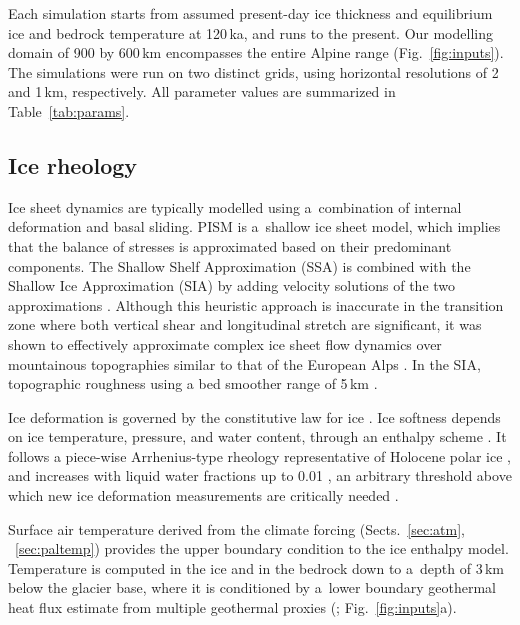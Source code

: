 \documentclass[tc, manuscript]{copernicus}
\begin{document}
    Each simulation starts from assumed present-day ice thickness and
    equilibrium ice and bedrock temperature at 120\,ka, and runs to the
    present. Our modelling domain of 900 by 600\,km encompasses the
    entire Alpine range (Fig.~\ref{fig:inputs}). The simulations were run on
    two distinct grids, using horizontal resolutions of 2 and 1\,km,
    respectively.
    All parameter values are summarized in Table~\ref{tab:params}.


\subsection{Ice rheology}
\label{sec:icedyn}

    Ice sheet dynamics are typically modelled using a~combination of internal
    deformation and basal sliding. PISM is a~shallow ice sheet model, which
    implies that the balance of stresses is approximated based on their
    predominant components. The Shallow Shelf Approximation (SSA) is combined
    with the Shallow Ice Approximation (SIA) by adding velocity solutions of
    the two approximations \citep[Eqs.~7--9 and 15]{Winkelmann.etal.2011}.
    Although this heuristic approach is inaccurate in the transition zone
    where both vertical shear and longitudinal stretch are significant,
    it was shown to effectively approximate complex ice sheet flow
    dynamics over mountainous topographies similar to that of the European Alps
    \citep{Golledge.etal.2012, Ziemen.etal.2016}. In the SIA, topographic
    roughness using a bed smoother range of 5\,km \citep{Schoof.2003}.

    Ice deformation is governed by the constitutive law for ice
    \citep{Glen.1952, Nye.1953}. Ice softness depends on ice temperature,
    pressure, and water content, through an enthalpy scheme
    \citep[Table~\ref{tab:params};][]{Aschwanden.etal.2012}. It follows a
    piece-wise Arrhenius-type rheology representative of Holocene polar ice
    \citep[Table~\ref{tab:params};][p.~77]{Cuffey.Paterson.2010}, and increases
    with liquid water fractions up to 0.01 \citep[p.~65--66]{Duval.1977,
    Lliboutry.Duval.1985, Cuffey.Paterson.2010}, an arbitrary threshold above
    which new ice deformation measurements are critically needed
    \citep{Kleiner.etal.2015}.

    Surface air temperature derived from the climate forcing
    (Sects.~\ref{sec:atm}, ~\ref{sec:paltemp}) provides the upper boundary
    condition to the ice
    enthalpy model. Temperature is computed in the ice and in the bedrock down
    to a~depth of 3\,km below the glacier base, where it is
    conditioned by a~lower boundary geothermal heat flux estimate from multiple
    geothermal proxies (\citealp[similarity method]{Goutorbe.etal.2011};
    Fig.~\ref{fig:inputs}a).
\end{document}
